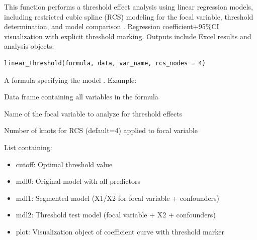\documentclass[a4paper]{book}
\begin{document}
%
\begin{Description}
This function performs a threshold effect analysis using linear regression models,
including restricted cubic spline (RCS) modeling for the focal variable,
threshold determination, and model comparison .
Regression coefficient+95\%CI visualization with explicit threshold marking.
Outputs include Excel results and analysis objects.
\end{Description}
%
\begin{Usage}
\begin{verbatim}
linear_threshold(formula, data, var_name, rcs_nodes = 4)
\end{verbatim}
\end{Usage}
%
\begin{Arguments}
\begin{ldescription}
\item[\code{formula}] A formula specifying the model .
Example: 

\item[\code{data}] Data frame containing all variables in the formula

\item[\code{var\_name}] Name of the focal variable to analyze for threshold effects

\item[\code{rcs\_nodes}] Number of knots for RCS (default=4) applied to focal variable
\end{ldescription}
\end{Arguments}
%
\begin{Value}
List containing:
\begin{itemize}

\item{} cutoff: Optimal threshold value
\item{} mdl0: Original model with all predictors
\item{} mdl1: Segmented model (X1/X2 for focal variable + confounders)
\item{} mdl2: Threshold test model (focal variable + X2 + confounders)
\item{} plot: Visualization object of coefficient curve with threshold marker

\end{itemize}

\end{Value}
\end{document}
